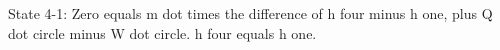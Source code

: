 State 4-1:
Zero equals m dot times the difference of h four minus h one, plus Q dot circle minus W dot circle.
h four equals h one.